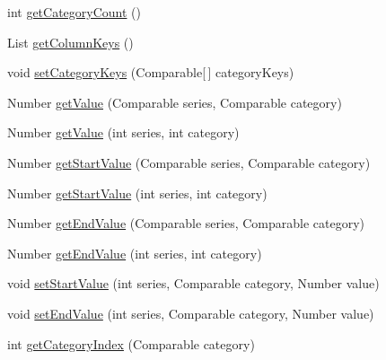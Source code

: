 \begin{DoxyCompactItemize}
int \mbox{\hyperlink{classorg_1_1jfree_1_1data_1_1category_1_1_default_interval_category_dataset_af1e71ac84aa326b3b7ef89c398e5c0fb}{get\+Category\+Count}} ()
\item 
List \mbox{\hyperlink{classorg_1_1jfree_1_1data_1_1category_1_1_default_interval_category_dataset_a1601fe05521b19269fc838d371907613}{get\+Column\+Keys}} ()
\item 
void \mbox{\hyperlink{classorg_1_1jfree_1_1data_1_1category_1_1_default_interval_category_dataset_a14b094d927d4e3002f48c30123e72c5c}{set\+Category\+Keys}} (Comparable\mbox{[}$\,$\mbox{]} category\+Keys)
\item 
Number \mbox{\hyperlink{classorg_1_1jfree_1_1data_1_1category_1_1_default_interval_category_dataset_a29084222ab5d48db99953fabcd209d03}{get\+Value}} (Comparable series, Comparable category)
\item 
Number \mbox{\hyperlink{classorg_1_1jfree_1_1data_1_1category_1_1_default_interval_category_dataset_a675e42c05d2be1193e867907ad490995}{get\+Value}} (int series, int category)
\item 
Number \mbox{\hyperlink{classorg_1_1jfree_1_1data_1_1category_1_1_default_interval_category_dataset_a3176b53014d159af5ca98190d4ce27ee}{get\+Start\+Value}} (Comparable series, Comparable category)
\item 
Number \mbox{\hyperlink{classorg_1_1jfree_1_1data_1_1category_1_1_default_interval_category_dataset_a784e915bf76954a434bf44f587fcb29b}{get\+Start\+Value}} (int series, int category)
\item 
Number \mbox{\hyperlink{classorg_1_1jfree_1_1data_1_1category_1_1_default_interval_category_dataset_a6b536be218d6a7cafe97ef2d26c85c38}{get\+End\+Value}} (Comparable series, Comparable category)
\item 
Number \mbox{\hyperlink{classorg_1_1jfree_1_1data_1_1category_1_1_default_interval_category_dataset_a4b514652a603f11d569d6797bd0bbe61}{get\+End\+Value}} (int series, int category)
\item 
void \mbox{\hyperlink{classorg_1_1jfree_1_1data_1_1category_1_1_default_interval_category_dataset_a60c40bf48394d98ed8680c2314fb11e7}{set\+Start\+Value}} (int series, Comparable category, Number value)
\item 
void \mbox{\hyperlink{classorg_1_1jfree_1_1data_1_1category_1_1_default_interval_category_dataset_a0addba6b157fce6c663310a949b06dc5}{set\+End\+Value}} (int series, Comparable category, Number value)
\item 
int \mbox{\hyperlink{classorg_1_1jfree_1_1data_1_1category_1_1_default_interval_category_dataset_a3cc570f2c983a658ddf8aae36a84e57d}{get\+Category\+Index}} (Comparable category)

\end{DoxyCompactItemize}
